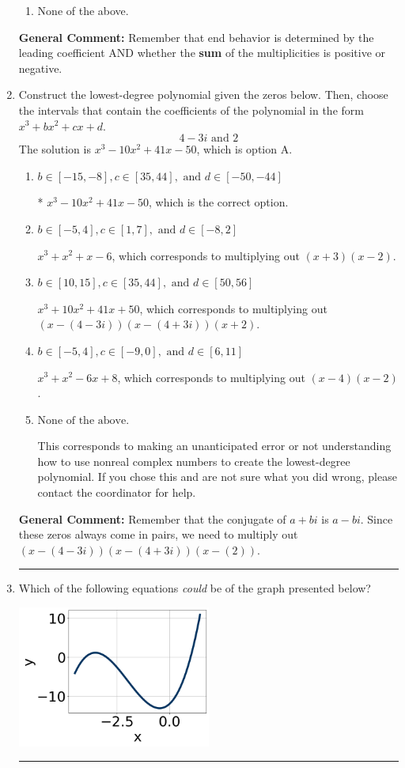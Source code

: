 \documentclass{extbook}[14pt]
\newcommand{\litem}[1]{\item #1

\rule{\textwidth}{0.4pt}}
\begin{document}
\begin{enumerate}
{\begin{enumerate}[label=\Alph*.]
\begin{multicols}{2}
\end{multicols}\item None of the above.\end{enumerate}
\textbf{General Comment:} Remember that end behavior is determined by the leading coefficient AND whether the \textbf{sum} of the multiplicities is positive or negative.
}
\litem{
Construct the lowest-degree polynomial given the zeros below. Then, choose the intervals that contain the coefficients of the polynomial in the form $x^3+bx^2+cx+d$.
\[ 4 - 3 i \text{ and } 2 \]The solution is \( x^{3} -10 x^{2} +41 x -50 \), which is option A.\begin{enumerate}[label=\Alph*.]
\item \( b \in [-15, -8], c \in [35, 44], \text{ and } d \in [-50, -44] \)

* $x^{3} -10 x^{2} +41 x -50$, which is the correct option.
\item \( b \in [-5, 4], c \in [1, 7], \text{ and } d \in [-8, 2] \)

$x^{3} + x^{2} +x -6$, which corresponds to multiplying out $(x + 3)(x -2)$.
\item \( b \in [10, 15], c \in [35, 44], \text{ and } d \in [50, 56] \)

$x^{3} +10 x^{2} +41 x + 50$, which corresponds to multiplying out $(x-(4 - 3 i))(x-(4 + 3 i))(x + 2)$.
\item \( b \in [-5, 4], c \in [-9, 0], \text{ and } d \in [6, 11] \)

$x^{3} + x^{2} -6 x + 8$, which corresponds to multiplying out $(x -4)(x -2)$.
\item \( \text{None of the above.} \)

This corresponds to making an unanticipated error or not understanding how to use nonreal complex numbers to create the lowest-degree polynomial. If you chose this and are not sure what you did wrong, please contact the coordinator for help.
\end{enumerate}

\textbf{General Comment:} Remember that the conjugate of $a+bi$ is $a-bi$. Since these zeros always come in pairs, we need to multiply out $(x-(4 - 3 i))(x-(4 + 3 i))(x-(2))$.
}
\litem{
Which of the following equations \textit{could} be of the graph presented below?

\begin{center}
    \includegraphics[width=0.5\textwidth]{../Figures/polyGraphToFunctionCopyB.png}
\end{center}


}
\end{enumerate}
\end{document}
